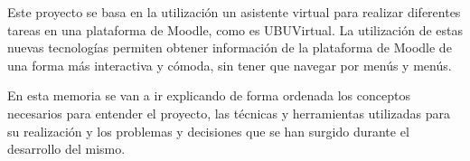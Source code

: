 
Este proyecto se basa en la utilización un asistente virtual para realizar diferentes tareas en una plataforma de Moodle, como es  UBUVirtual. La utilización de estas nuevas tecnologías permiten obtener información de la plataforma de Moodle de una forma más interactiva y cómoda, sin tener que navegar por menús y menús.

En esta memoria se van a ir explicando de forma ordenada los conceptos necesarios para entender el proyecto, las técnicas y herramientas utilizadas para su realización y los problemas y decisiones que se han surgido durante el desarrollo del mismo.